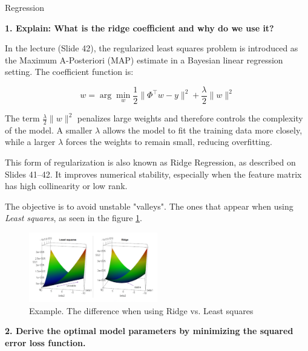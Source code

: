\documentclass[
	english,
        solution=true
	]{tudaexercise}
\begin{document}
\begin{task}[points=34]{Regression}
\begin{subtask}[points=8, title=Linear Features]
        \begin{solution}
            \textbf{1. Explain: What is the ridge coefficient and why do we use it?}

            In the lecture (Slide 42), the regularized least squares problem is introduced as the Maximum A-Posteriori (MAP) estimate in a Bayesian linear regression setting.
            The coefficient function is:

            \[
            w = \arg\min_w \frac{1}{2} \|\Phi^\top w - y\|^2 + \frac{\lambda}{2} \|w\|^2
            \]


            The term $\frac{\lambda}{2} \|w\|^2$ penalizes large weights and therefore controls the complexity of the model.
            A smaller $\lambda$ allows the model to fit the training data more closely, while a larger $\lambda$ forces the weights to remain small, reducing overfitting.

            This form of regularization is also known as Ridge Regression, as described on Slides 41–42. It improves numerical stability, especially when the feature matrix has high collinearity or low rank.

            The objective is to avoid unstable "valleys".
            The ones that appear when using \textit{Least squares}, as seen in the figure \ref{Task1a_1}.

            \begin{figure}[H]
                \centering
                \includegraphics[width=0.5\textwidth]{images/Task1a_1.png}
                \caption{Example. The difference when using Ridge vs. Least squares}
                \label{Task1a_1}
            \end{figure}
            
            \vspace{2em}

            \textbf{2. Derive the optimal model parameters by minimizing the squared error loss function.}


\end{solution}
\end{subtask}
\end{task}
\end{document}
